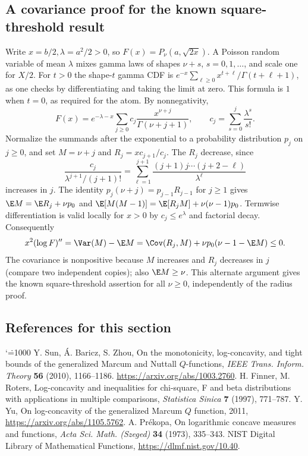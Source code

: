 \documentclass[11pt,a4paper]{article}
\makeatletter
\numberwithin{equation}{section}
\theoremstyle{definition}
\theoremstyle{remark}
\renewenvironment{thebibliography}[1]
 {\subsection*{References for this section}\small
  \list{\@biblabel{\@arabic\c@enumiv}}
       {\settowidth\labelwidth{\@biblabel{#1}}\leftmargin\labelwidth
        \advance\leftmargin\labelsep\@openbib@code
        \usecounter{enumiv}\let\p@enumiv\@empty
        \renewcommand\theenumiv{\@arabic\c@enumiv}}
  \sloppy\clubpenalty4000\widowpenalty4000\sfcode`\.=1000\relax}
 {\def\@noitemerr{\@latex@warning{Empty bibliography}}\endlist}
\makeatother
\begin{document}
\subsection{A covariance proof for the known square-threshold result}
Write \(x=b/2,\lambda=a^2/2>0\), so
\(F(x)=P_\nu(a,\sqrt{2x})\). A Poisson random variable of mean
\(\lambda\) mixes gamma laws of shapes \(\nu+s\), \(s=0,1,\ldots\),
and scale one for \(X/2\). For \(t>0\) the shape-\(t\) gamma CDF is
\(e^{-x}\sum_{\ell\ge0} x^{t+\ell}/\Gamma(t+\ell+1)\), as one
checks by differentiating and taking the limit at zero. This formula
is \(1\) when \(t=0\), as required for the atom. By nonnegativity,
\[
 F(x)=e^{-\lambda-x}\sum_{j\ge0}c_j\frac{x^{\nu+j}}{\Gamma(\nu+j+1)},
 \qquad c_j=\sum_{s=0}^j\frac{\lambda^s}{s!}.
\]
Normalize the summands after the exponential to a probability
distribution \(p_j\) on \(j\ge0\), and set \(M=\nu+j\) and
\(R_j=x c_{j+1}/c_j\). The \(R_j\) decrease, since
\[
 \frac{c_j}{\lambda^{j+1}/(j+1)!}
 =\sum_{\ell=1}^{j+1}\frac{(j+1)j\cdots(j+2-\ell)}{\lambda^\ell}
\]
increases in \(j\).
The identity \(p_j(\nu+j)=p_{j-1}R_{j-1}\) for \(j\ge1\) gives
\(\E M=\E R_j+\nu p_0\) and
\(\E[M(M-1)]=\E[R_j M]+\nu(\nu-1)p_0\).
Termwise differentiation is valid locally for \(x>0\) by
\(c_j\le e^\lambda\) and factorial decay. Consequently
\[
 x^2(\log F)''=\Var(M)-\E M
 =\Cov(R_j,M)+\nu p_0(\nu-1-\E M)\le0.
\]
The covariance is nonpositive because \(M\) increases and \(R_j\)
decreases in \(j\) (compare two independent copies); also \(\E M\ge\nu\).
This alternate argument gives the known square-threshold assertion
for all \(\nu\ge0\), independently of the radius proof.
\begin{thebibliography}{9}
 Y. Sun, \'A. Baricz, S. Zhou, On the monotonicity,
log-concavity, and tight bounds of the generalized Marcum and Nuttall
\(Q\)-functions, \emph{IEEE Trans. Inform. Theory} \textbf{56}
(2010), 1166--1186. \url{https://arxiv.org/abs/1003.2760}.
 H. Finner, M. Roters, Log-concavity and inequalities for
chi-square, F and beta distributions with applications in multiple
comparisons, \emph{Statistica Sinica} \textbf{7} (1997), 771--787.
 Y. Yu, On log-concavity of the generalized Marcum
\(Q\) function, 2011, \url{https://arxiv.org/abs/1105.5762}.
 A. Pr\'ekopa, On logarithmic concave measures and
functions, \emph{Acta Sci. Math. (Szeged)} \textbf{34} (1973), 335--343.
 NIST Digital Library of Mathematical Functions,
\url{https://dlmf.nist.gov/10.40}.
\end{thebibliography}
\end{document}
